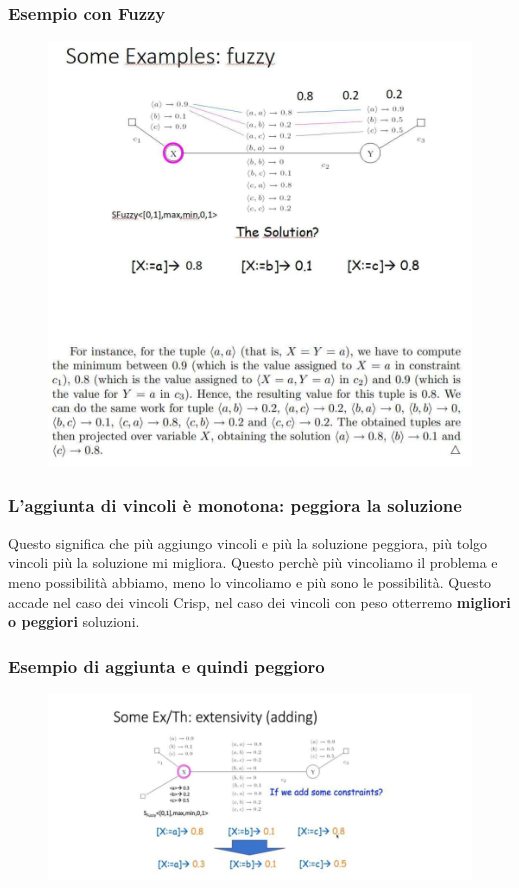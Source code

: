 \subsubsection{Esempio con Fuzzy}
\begin{figure}[htp]
	\centering
    \includegraphics[width=13cm, keepaspectratio]{img/Cap4/fuzzy.png}
\end{figure}
\newpage
\subsubsection{L’aggiunta di vincoli è monotona: peggiora la soluzione}
Questo significa che più aggiungo vincoli e più la soluzione peggiora, più tolgo vincoli più la soluzione mi migliora. Questo perchè più vincoliamo il problema e meno possibilità abbiamo, meno lo vincoliamo e più sono le possibilità. Questo accade nel caso dei vincoli Crisp, nel caso dei vincoli con peso otterremo \textbf{migliori o peggiori} soluzioni.
\subsubsection{Esempio di aggiunta e quindi peggioro}
\begin{figure}[htp]
	\centering
    \includegraphics[width=13cm, keepaspectratio]{img/Cap4/worst.png}
\end{figure}
